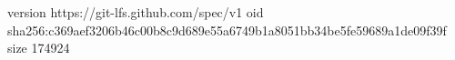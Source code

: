 version https://git-lfs.github.com/spec/v1
oid sha256:c369aef3206b46c00b8c9d689e55a6749b1a8051bb34be5fe59689a1de09f39f
size 174924
